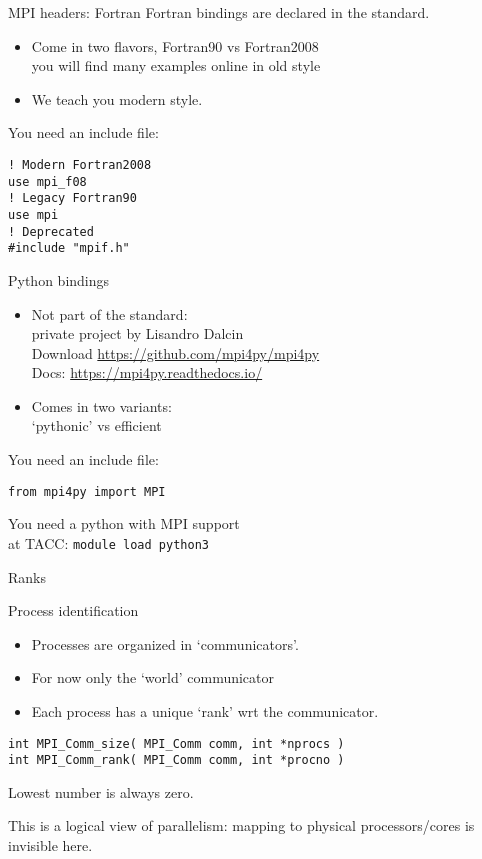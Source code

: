 \begin{fortran}
  \addtocounter{slidecount}{-1}
\begin{numberedframe}{MPI headers: Fortran}
    \label{sl:mpi-header-f}
    Fortran bindings are declared in the standard.
    \begin{itemize}
    \item Come in two flavors, Fortran90 vs Fortran2008\\
      you will find many examples online in old style
    \item We teach you modern style.
    \end{itemize}
    You need an include file:
\begin{verbatim}
! Modern Fortran2008
use mpi_f08
! Legacy Fortran90
use mpi       
! Deprecated
#include "mpif.h"
\end{verbatim}
\end{numberedframe}
\end{fortran}

\begin{python}
  \addtocounter{slidecount}{-1}
\begin{numberedframe}{Python bindings}
    \label{sl:mpi-header-p}
    \begin{itemize}
    \item Not part of the standard:\\
      private project by Lisandro Dalcin\\
      Download \url{https://github.com/mpi4py/mpi4py}\\
      Docs: \url{https://mpi4py.readthedocs.io/}
    \item Comes in two variants:\\
      `pythonic' vs efficient
    \end{itemize}
    You need an include file:
\begin{verbatim}
from mpi4py import MPI
\end{verbatim}
You need a python with MPI support\\
at TACC: \texttt{module load python3}
\end{numberedframe}
\end{python}

 {Ranks}

\begin{numberedframe}{Process identification}
  \label{sl:comm-world}
  \begin{itemize}
  \item Processes are organized in `communicators'.
  \item For now only the `world' communicator
  \item Each process has a unique `rank' wrt the communicator.
  \end{itemize}
\lstset{language=C}
\begin{lstlisting}
int MPI_Comm_size( MPI_Comm comm, int *nprocs )
int MPI_Comm_rank( MPI_Comm comm, int *procno )
\end{lstlisting}
Lowest number is always zero.

This is a logical view of parallelism: mapping to physical
processors/cores is invisible here.
\end{numberedframe}

